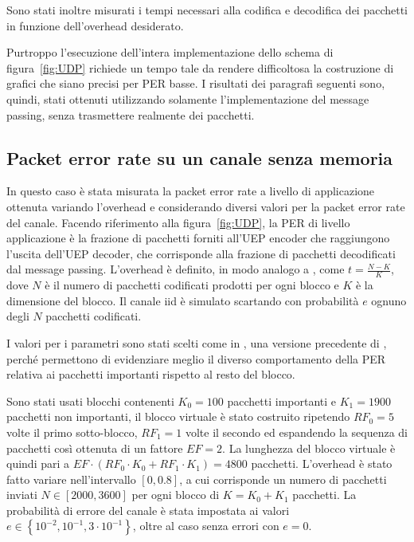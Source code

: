 \documentclass[italian, a4paper, 12pt]{article}
\begin{document}
Sono stati inoltre misurati i tempi necessari alla codifica e
decodifica dei pacchetti in funzione dell'overhead desiderato.

Purtroppo l'esecuzione dell'intera implementazione dello schema di
figura~\ref{fig:UDP} richiede un tempo tale da rendere difficoltosa la
costruzione di grafici che siano precisi per PER basse.
%
I risultati dei paragrafi seguenti sono, quindi, stati ottenuti
utilizzando solamente l'implementazione del message passing, senza
trasmettere realmente dei pacchetti.

\subsection{Packet error rate su un canale senza memoria}
In questo caso è stata misurata la packet error rate a livello di
applicazione ottenuta variando l'overhead e considerando diversi
valori per la packet error rate del canale.
%
Facendo riferimento alla figura~\ref{fig:UDP}, la PER di livello
applicazione è la frazione di pacchetti forniti all'UEP encoder che
raggiungono l'uscita dell'UEP decoder, che corrisponde alla frazione
di pacchetti decodificati dal message passing.
%
L'overhead è definito, in modo analogo a \cite{uep}, come $t =
\frac{N-K}{K}$, dove $N$ è il numero di pacchetti codificati prodotti
per ogni blocco e $K$ è la dimensione del blocco.
%
Il canale iid è simulato scartando con probabilità $e$ ognuno degli
$N$ pacchetti codificati.

I valori per i parametri sono stati scelti come in \cite{uepother},
una versione precedente di \cite{uep}, perché permettono di
evidenziare meglio il diverso comportamento della PER relativa ai
pacchetti importanti rispetto al resto del blocco.

Sono stati usati blocchi contenenti $K_0 = 100$ pacchetti importanti e
$K_1 = 1900$ pacchetti non importanti, il blocco virtuale è stato
costruito ripetendo $RF_0 = 5$ volte il primo sotto-blocco, $RF_1 = 1$
volte il secondo ed espandendo la sequenza di pacchetti così ottenuta
di un fattore $EF = 2$. La lunghezza del blocco virtuale è quindi pari
a $EF \cdot \left( RF_0 \cdot K_0 + RF_1 \cdot K_1 \right) = 4800$
pacchetti.
%
L'overhead è stato fatto variare nell'intervallo $[0, 0.8]$, a cui
corrisponde un numero di pacchetti inviati $N \in [2000, 3600]$ per
ogni blocco di $K=K_0+K_1$ pacchetti.
%
La probabilità di errore del canale è stata impostata ai valori $e \in
\left\{10^{-2}, 10^{-1}, 3 \cdot 10^{-1} \right\}$, oltre al caso
senza errori con $e=0$.
\end{document}
